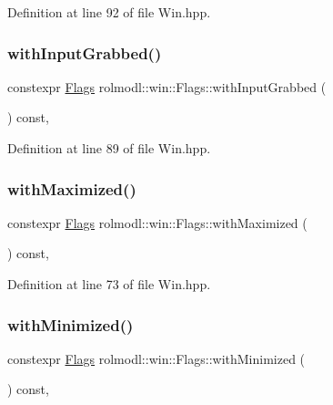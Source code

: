 Definition at line 92 of file Win.\+hpp.

\mbox{\label{structrolmodl_1_1win_1_1_flags_aab417768b97fc6f0e5d97e1cc6fe449c}} 
\subsubsection{\texorpdfstring{withInputGrabbed()}{withInputGrabbed()}}
{\footnotesize\ttfamily constexpr \mbox{\hyperlink{structrolmodl_1_1win_1_1_flags}{Flags}} rolmodl\+::win\+::\+Flags\+::with\+Input\+Grabbed (\begin{DoxyParamCaption}{ }\end{DoxyParamCaption}) const\hspace{0.3cm}{\ttfamily [inline]}, {\ttfamily [noexcept]}}



Definition at line 89 of file Win.\+hpp.

\mbox{\label{structrolmodl_1_1win_1_1_flags_a957aae3e030c55c8a8814c3ff688eede}} 
\subsubsection{\texorpdfstring{withMaximized()}{withMaximized()}}
{\footnotesize\ttfamily constexpr \mbox{\hyperlink{structrolmodl_1_1win_1_1_flags}{Flags}} rolmodl\+::win\+::\+Flags\+::with\+Maximized (\begin{DoxyParamCaption}{ }\end{DoxyParamCaption}) const\hspace{0.3cm}{\ttfamily [inline]}, {\ttfamily [noexcept]}}



Definition at line 73 of file Win.\+hpp.

\mbox{\label{structrolmodl_1_1win_1_1_flags_a5644d56c5e448a7e79ff0fdf24dd73e4}} 
\subsubsection{\texorpdfstring{withMinimized()}{withMinimized()}}
{\footnotesize\ttfamily constexpr \mbox{\hyperlink{structrolmodl_1_1win_1_1_flags}{Flags}} rolmodl\+::win\+::\+Flags\+::with\+Minimized (\begin{DoxyParamCaption}{ }\end{DoxyParamCaption}) const\hspace{0.3cm}{\ttfamily [inline]}, {\ttfamily [noexcept]}}




